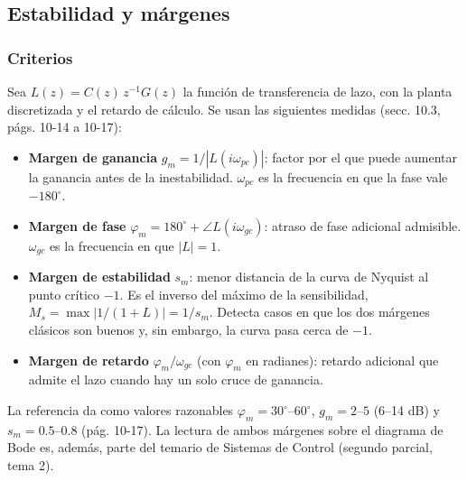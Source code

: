 \subsection{Estabilidad y márgenes}
\label{sec:cc_estabilidad}
\subsubsection{Criterios}
Sea $L(z) = C(z)\,z^{-1}G(z)$ la función de transferencia de lazo, con la planta discretizada y el retardo de cálculo. Se usan las siguientes medidas \cite{astrom2020} (secc. 10.3, págs. 10-14 a 10-17):
\begin{itemize}
\item \textbf{Margen de ganancia} $g_m = 1/|L(i\omega_{pc})|$: factor por el que puede aumentar la ganancia antes de la inestabilidad. $\omega_{pc}$ es la frecuencia en que la fase vale $-180^\circ$.
\item \textbf{Margen de fase} $\varphi_m = 180^\circ + \angle L(i\omega_{gc})$: atraso de fase adicional admisible. $\omega_{gc}$ es la frecuencia en que $|L| = 1$.
\item \textbf{Margen de estabilidad} $s_m$: menor distancia de la curva de Nyquist al punto crítico $-1$. Es el inverso del máximo de la sensibilidad, $M_s = \max|1/(1+L)| = 1/s_m$. Detecta casos en que los dos márgenes clásicos son buenos y, sin embargo, la curva pasa cerca de $-1$.
\item \textbf{Margen de retardo} $\varphi_m/\omega_{gc}$ (con $\varphi_m$ en radianes): retardo adicional que admite el lazo cuando hay un solo cruce de ganancia.
\end{itemize}
La referencia da como valores razonables $\varphi_m = 30^\circ$--$60^\circ$, $g_m = 2$--$5$ (6--14 dB) y $s_m = 0.5$--$0.8$ (pág. 10-17). La lectura de ambos márgenes sobre el diagrama de Bode es, además, parte del temario de Sistemas de Control \cite{sistcontrol2025} (segundo parcial, tema 2).

